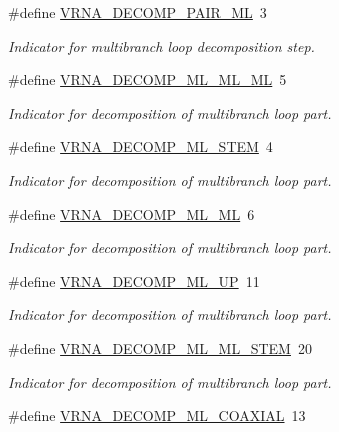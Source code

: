 \begin{DoxyCompactItemize}
\#define \hyperlink{group__constraints_gaa15b1185673f0b9e900c4748d45f388f}{V\+R\+N\+A\+\_\+\+D\+E\+C\+O\+M\+P\+\_\+\+P\+A\+I\+R\+\_\+\+M\+L}~3
\begin{DoxyCompactList}\small\item\em Indicator for multibranch loop decomposition step. \end{DoxyCompactList}\item 
\#define \hyperlink{group__constraints_ga735517266f2e35e1374b8f1ea77ef23e}{V\+R\+N\+A\+\_\+\+D\+E\+C\+O\+M\+P\+\_\+\+M\+L\+\_\+\+M\+L\+\_\+\+M\+L}~5
\begin{DoxyCompactList}\small\item\em Indicator for decomposition of multibranch loop part. \end{DoxyCompactList}\item 
\#define \hyperlink{group__constraints_ga4a23054c75d8efc785de50e3ea87602f}{V\+R\+N\+A\+\_\+\+D\+E\+C\+O\+M\+P\+\_\+\+M\+L\+\_\+\+S\+T\+E\+M}~4
\begin{DoxyCompactList}\small\item\em Indicator for decomposition of multibranch loop part. \end{DoxyCompactList}\item 
\#define \hyperlink{group__constraints_ga7f4cb9ff7a33e67f0539bd39e7b19a78}{V\+R\+N\+A\+\_\+\+D\+E\+C\+O\+M\+P\+\_\+\+M\+L\+\_\+\+M\+L}~6
\begin{DoxyCompactList}\small\item\em Indicator for decomposition of multibranch loop part. \end{DoxyCompactList}\item 
\#define \hyperlink{group__constraints_gae6478dda14e50e2f2cb9ef333a29256e}{V\+R\+N\+A\+\_\+\+D\+E\+C\+O\+M\+P\+\_\+\+M\+L\+\_\+\+U\+P}~11
\begin{DoxyCompactList}\small\item\em Indicator for decomposition of multibranch loop part. \end{DoxyCompactList}\item 
\#define \hyperlink{group__constraints_ga63d8ceb8c96ae3b463e529e28cc0fe98}{V\+R\+N\+A\+\_\+\+D\+E\+C\+O\+M\+P\+\_\+\+M\+L\+\_\+\+M\+L\+\_\+\+S\+T\+E\+M}~20
\begin{DoxyCompactList}\small\item\em Indicator for decomposition of multibranch loop part. \end{DoxyCompactList}\item 
\#define \hyperlink{group__constraints_ga4fe48d575830b16c208e280e01ab1497}{V\+R\+N\+A\+\_\+\+D\+E\+C\+O\+M\+P\+\_\+\+M\+L\+\_\+\+C\+O\+A\+X\+I\+A\+L}~13

\end{DoxyCompactItemize}

